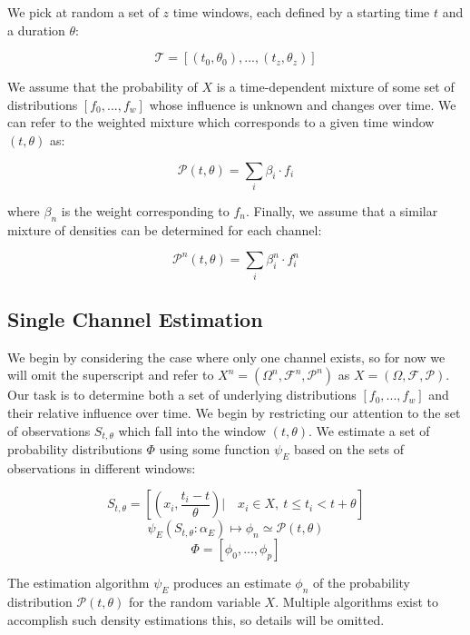 \documentclass[10pt]{article}
\begin{document}
We pick at random a set of \( z \) time windows, each defined by a starting time \( t \) and a duration \( \theta \):

\[  \mathcal{T} = [(t_0,\theta_0),...,(t_z,\theta_z) ] \]

We assume that the probability of \(X \) is a time-dependent mixture of some set of distributions \( [f_0,...,f_w] \) whose influence is unknown and changes over time.  We can refer to the weighted mixture which corresponds to a given time window \( (t,\theta) \) as:

\begin{equation} \mathcal{P}(t,\theta) = \sum_i \beta_i \cdot f_i \end{equation}

where \( \beta_n \) is the weight corresponding to \( f_n \).  Finally, we assume that a similar mixture of densities can be determined for each channel:

\begin{equation} \mathcal{P}^n(t,\theta) = \sum_i \beta_i^n \cdot f_i^n \end{equation}

\subsection{Single Channel Estimation}
We begin by considering the case where only one channel exists, so for now we will omit the superscript and refer to \(X^n = (\Omega^n,\mathcal{F}^n,\mathcal{P}^n) \) as \(X = (\Omega, \mathcal{F},\mathcal{P}) \).  Our task is to determine both a set of underlying distributions \([f_0,...,f_w] \) and their relative influence over time.  We begin by restricting our attention to the set of observations \( S_{t,\theta} \) which fall into the window \( (t,\theta) \).  We estimate a set of probability distributions \(\Phi \) using some function \(\psi_E \) based on the sets of observations in different windows:

\begin{equation} S_{t,\theta} = \left[ \left( x_i,\frac{t_i - t}{\theta} \right) | \quad x_i \in X, \ t \le t_i < t+\theta \right] \end{equation}
\begin{equation} \psi_E( S_{t,\theta}:\alpha_E ) \mapsto \phi_n \simeq \mathcal{P}(t,\theta)  \end{equation}
\[ \Phi = [\phi_0,...,\phi_p ] \nonumber \]

The estimation algorithm \(\psi_{E} \) produces an estimate \(\phi_n \) of the probability distribution \( \mathcal{P}(t,\theta) \) for the random variable \( X \).  Multiple algorithms exist to accomplish such density estimations this, so details will be omitted.
\end{document}
